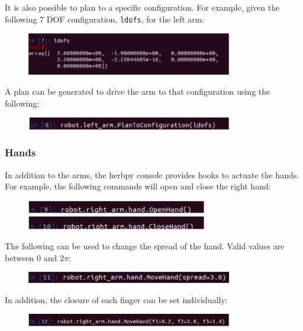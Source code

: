 \documentclass[11pt, oneside]{article}
\begin{document}
It is also possible to plan to a specific configuration.  For example, given the following 7 DOF configuration, \texttt{ldofs}, for the left arm:
\begin{figure}[h]
\centering
\includegraphics[width=0.8\textwidth]{figs/ldofs.jpg}
\end{figure}
\newline\newline
A plan can be generated to drive the arm to that configuration using the following:
\begin{figure}[h]
\centering
\includegraphics[width=0.8\textwidth]{figs/leftarmplanner.jpg}
\end{figure}

\newpage
\subsubsection{Hands}
In addition to the arms, the herbpy console provides hooks to actuate the hands.  For example, the following commands will open and close the right hand:
\begin{figure}[h]
\centering
\includegraphics[width=0.7\textwidth]{figs/openhand}
\includegraphics[width=0.7\textwidth]{figs/closehand}
\end{figure}

The following can be used to change the spread of the hand. Valid values are between 0 and $2\pi$:
\begin{figure}[h]
\centering
\includegraphics[width=0.8\textwidth]{figs/spread}
\end{figure}

In addition, the closure of each finger can be set individually:
\begin{figure}[h]
\centering
\includegraphics[width=0.8\textwidth]{figs/fingers}
\end{figure}
\end{document}
